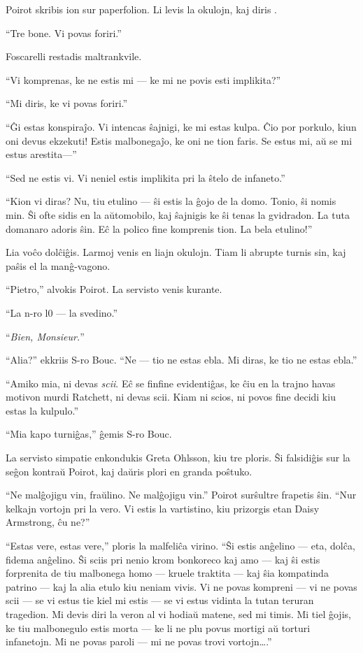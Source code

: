 Poirot skribis ion sur paperfolion. Li levis la okulojn, kaj diris .

``Tre bone. Vi povas foriri.''

Foscarelli restadis maltrankvile.

``Vi komprenas, ke ne estis mi --- ke mi ne povis esti implikita?''

``Mi diris, ke vi povas foriri.''

``Ĝi estas konspiraĵo. Vi intencas ŝajnigi, ke mi estas kulpa. Ĉio por porkulo, kiun oni devus ekzekuti! Estis malbonegaĵo, ke oni ne tion faris. Se estus mi, aŭ se mi estus arestita---''

``Sed ne estis vi. Vi neniel estis implikita pri la ŝtelo de infaneto.''

``Kion vi diras? Nu, tiu etulino --- ŝi estis la ĝojo de la domo. Tonio, ŝi nomis min. Ŝi ofte sidis en la aŭtomobilo, kaj ŝajnigis ke ŝi tenas la gvidradon. La tuta domanaro adoris ŝin. Eĉ la polico fine komprenis tion. La bela etulino!''

Lia voĉo dolĉiĝis. Larmoj venis en liajn okulojn. Tiam li abrupte turnis sin, kaj paŝis el la manĝ-vagono.

``Pietro,'' alvokis Poirot. La servisto venis kurante.

``La n-ro l0 --- la svedino.''

``\emph{Bien, Monsieur.}''

``Alia?'' ekkriis S-ro Bouc. ``Ne --- tio ne estas ebla. Mi diras, ke tio ne estas ebla.''

``Amiko mia, ni devas \emph{scii}. Eĉ se finfine evidentiĝas, ke ĉiu en la trajno havas motivon murdi Ratchett, ni devas scii. Kiam ni scios, ni povos fine decidi kiu estas la kulpulo.''

``Mia kapo turniĝas,'' ĝemis S-ro Bouc.

La servisto simpatie enkondukis Greta Ohlsson, kiu tre ploris. Ŝi falsidiĝis sur la seĝon kontraŭ Poirot, kaj daŭris plori en granda poŝtuko.

``Ne malĝojigu vin, fraŭlino. Ne malĝojigu vin.'' Poirot surŝultre frapetis ŝin. ``Nur kelkajn vortojn pri la vero. Vi estis la vartistino, kiu prizorgis etan Daisy Armstrong, ĉu ne?''

``Estas vere, estas vere,'' ploris la malfeliĉa virino. ``Ŝi estis anĝelino --- eta, dolĉa, fidema anĝelino. Ŝi sciis pri nenio krom bonkoreco kaj amo --- kaj ŝi estis forprenita de tiu malbonega homo --- kruele traktita --- kaj ŝia kompatinda patrino --- kaj la alia etulo kiu neniam vivis. Vi ne povas kompreni --- vi ne povas scii --- se vi estus tie kiel mi estis --- se vi estus vidinta la tutan teruran tragedion. Mi devis diri la veron al vi hodiaŭ matene, sed mi timis. Mi tiel ĝojis, ke tiu malbonegulo estis morta --- ke li ne plu povus mortigi aŭ torturi infanetojn. Mi ne povas paroli --- mi ne povas trovi vortojn{\ldots}.''

